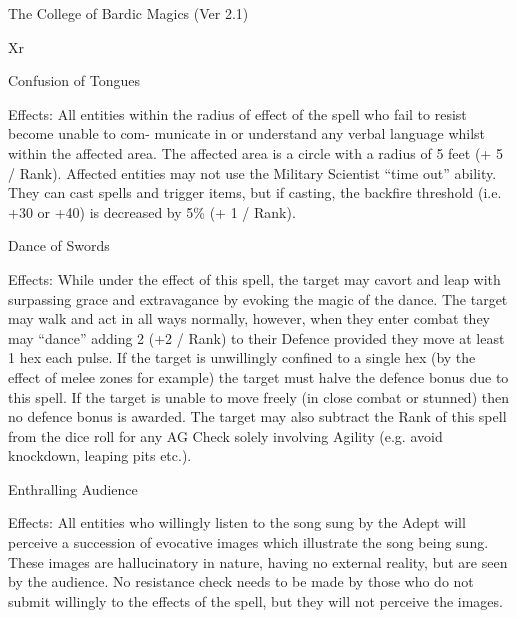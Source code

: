 \begin{Chapter}{The College of Bardic Magics (Ver 2.1)}
\begin{tarularx}{\columnwidth}{Xr}
\begin{spell}[S-4]{Confusion of Tongues }

Effects:  All  entities  within  the  radius  of  effect  of 
the spell  who fail to  resist become unable to com-
municate  in  or  understand  any  verbal  language 
whilst within the affected area. The affected area is 
a  circle  with  a  radius  of  5  feet  (+  5  /  Rank).  Affected  entities  may  not  use  the  Military  Scientist 
“time out” ability. They can cast spells and trigger 
items,  but  if  casting,  the  backfire  threshold  (i.e. 
+30 or +40) is decreased by 5\% (+ 1 / Rank). 
\end{spell}

\begin{spell}[S-5]{Dance of Swords }

Effects:  While  under  the  effect  of  this  spell,  the 
target  may  cavort  and  leap  with  surpassing  grace 
and  extravagance  by  evoking  the  magic  of  the 
dance.  The  target  may  walk  and  act  in  all  ways 
normally,  however,  when  they  enter  combat  they 
may “dance” adding 2 (+2 / Rank) to their Defence 
provided they move at least 1 hex each pulse. If the 
target  is  unwillingly  confined  to  a  single  hex  (by 
the  effect  of  melee  zones  for  example)  the  target 
must  halve  the  defence  bonus  due  to  this  spell.  If 
the target is unable to move freely (in close combat 
or stunned) then no defence bonus is awarded. The 
target may also subtract the Rank of this spell from 
the  dice  roll  for  any  AG  Check  solely  involving 
Agility (e.g. avoid knockdown, leaping pits etc.). 
\end{spell}

\begin{spell}[S-6]{Enthralling Audience }

Effects: All entities who willingly listen to the song 
sung  by  the  Adept  will  perceive  a  succession  of 
evocative  images  which  illustrate  the  song  being 
sung.  These  images  are  hallucinatory  in  nature, 
having  no  external  reality,  but  are  seen  by  the 
audience. No resistance check needs to be made by 
those who do not submit willingly to the effects of 
the  spell,  but  they  will  not  perceive  the  images. 


\end{spell}
\end{tarularx}
\end{Chapter}
